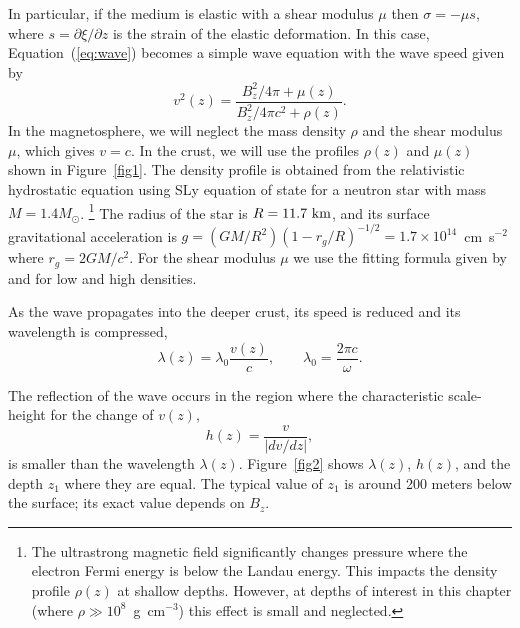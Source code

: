 In particular, if the medium is elastic with a shear modulus $\mu$ then $\sigma = -\mu s$, where $s=\partial\xi/\partial z$ is the strain of the elastic deformation. 
In this case, Equation~(\ref{eq:wave}) becomes a simple wave equation with the wave speed given by
\begin{equation}
  v^2(z)=\frac{B^2_z/4\pi+\mu(z)}{B^2_z/4\pi c^2+\rho(z)}. 
\end{equation}
In the magnetosphere, we will neglect the mass density $\rho$ and the shear modulus $\mu$, which gives $v=c$. In the crust, we will use the profiles $\rho(z)$ and $\mu(z)$ shown in Figure~\ref{fig1}. 
The density profile is obtained from the relativistic hydrostatic equation using SLy equation of state \citep{2004A&A...428..191H} for a neutron star with mass $M=1.4M_{\odot}$.
\footnote{The ultrastrong magnetic field significantly changes pressure where the electron Fermi energy is below the Landau energy. 
This impacts the density profile $\rho(z)$ at shallow depths. However, at depths of interest in this chapter (where $\rho\gg 10^8$~g~cm$^{-3}$) this effect is small and neglected.}     
The radius of the star is $R=11.7\rm ~km$, and its surface gravitational acceleration is $g = (GM/R^2)(1-r_g/R)^{-1/2}=1.7\times 10^{14}$\, cm~s$^{-2}$ where $r_g=2GM/c^2$.
For the shear modulus $\mu$ we use the fitting formula given by \citet{2005ApJ...634L.153P} and \citet{2007MNRAS.375..261S} for low and high densities. 

As the wave propagates into the deeper crust, its speed is reduced and its wavelength is compressed,
\begin{equation}
   \lambda(z) = \lambda_0 \frac{v(z)}{c},  \qquad \lambda_0=\frac{2\pi c}{\omega}.
\end{equation}

The reflection of the wave occurs in the region where the characteristic scale-height for the change of $v(z)$,
\begin{equation}
   h(z)=\frac{v}{|dv/dz|},
\end{equation} is smaller than the wavelength $\lambda(z)$. Figure~\ref{fig2} shows $\lambda(z)$, $h(z)$, and the depth $z_1$ where they are equal. 
The typical value of $z_1$ is around 200 meters below the surface; its exact value depends on $B_z$.

